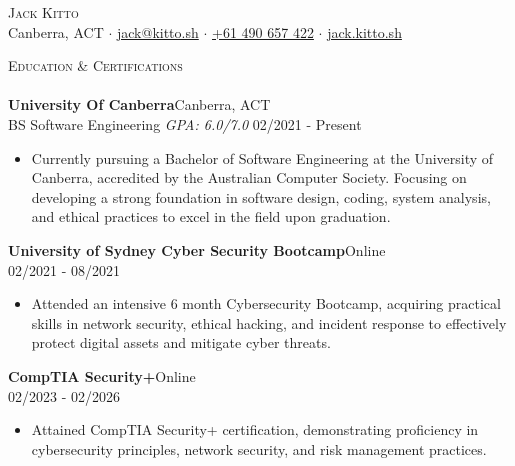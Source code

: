 \documentclass[a4paper]{article}
\newcommand{\lineunder} {
    \vspace*{-8pt} \\
    \hspace*{-18pt} \hrulefill \\
}
\newcommand{\header} [1] {
    {\hspace*{-18pt}\vspace*{6pt} \textsc{#1}}
    \vspace*{-6pt} \lineunder
}
\begin{document}
    \vspace*{-40pt}

\vspace*{-10pt}
\begin{center}
  {\Huge \scshape {Jack Kitto}}\\
  Canberra, ACT $\cdot$ \href{mailto:jack@kitto.sh}{jack@kitto.sh} $\cdot$ \href{tel:+61 490 657 422}{+61 490 657 422} $\cdot$ \url{jack.kitto.sh}\\
\end{center}

      \header{Education \& Certifications}
      \textbf{University Of Canberra}\hfill Canberra, ACT\\
BS Software Engineering \textit{GPA: 6.0/7.0} \hfill 02/2021 - Present\\
\begin{itemize} \itemsep 1pt
  \item Currently pursuing a Bachelor of Software Engineering at the University of Canberra, accredited by the Australian Computer Society. Focusing on developing a strong foundation in software design, coding, system analysis, and ethical practices to excel in the field upon graduation.
\end{itemize}


\vspace{2mm}
      \textbf{University of Sydney Cyber Security Bootcamp}\hfill Online\\
           \hfill 02/2021 - 08/2021\\
          \vspace{-1mm}
\begin{itemize} \itemsep 1pt
  \item Attended an intensive 6 month Cybersecurity Bootcamp, acquiring practical skills in network security, ethical hacking, and incident response to effectively protect digital assets and mitigate cyber threats.
\end{itemize}
          \vspace{2mm}
      \textbf{CompTIA Security+}\hfill Online\\
        \hfill 02/2023 - 02/2026\\
          \vspace{-1mm}
\begin{itemize} \itemsep 1pt
  \item Attained CompTIA Security+ certification, demonstrating proficiency in cybersecurity principles, network security, and risk management practices.
\end{itemize}
          \vspace{2mm}
\end{document}
